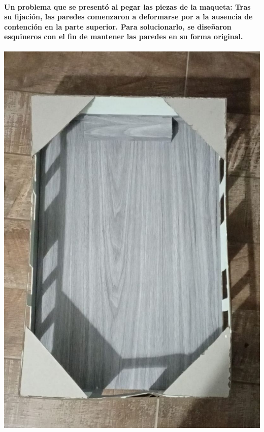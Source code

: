 \documentclass[12pt]{article} %
\newcommand{\normalparagraph}[1]{\paragraph{\textnormal{#1}}}
\begin{document}




\normalparagraph {Un problema que se presentó al pegar las piezas de la maqueta: Tras su fijación, las paredes comenzaron a deformarse por a la ausencia de contención en la parte superior. Para solucionarlo, se diseñaron esquineros con el fin de mantener las paredes en su forma original.}


\begin{center}
\begin{minipage}[b]{0.4\textwidth}
  \centering
  \includegraphics[width=\linewidth]{Pictures/Maqueta con soportes.jpg}
  \label{fig:maqueta}
\end{minipage}
\end{center}
\end{document}
